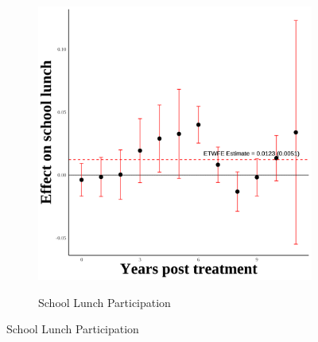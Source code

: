 \documentclass[12pt,english]{article}
\begin{document}
\begin{figure}[H]
\begin{subfigure}[b]{0.3\textwidth}
    \label{fig:ln-schl-lunch-third}
  \end{subfigure}
  \hfill
  \begin{subfigure}[b]{0.3\textwidth}
    \centering
    \caption{School Lunch Participation}
    \includegraphics[width=\linewidth]{figures/plot51-schl_lunch_event_study-third.png}
    \label{fig:schl-lunch-third}
  \end{subfigure}

  \vspace{0.3cm} %


\end{figure}
\end{document}
